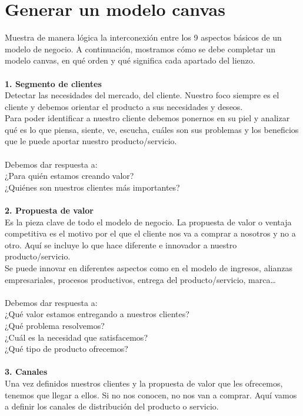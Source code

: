 \section{Generar un modelo canvas}
\item{
Muestra de manera lógica la interconexión entre los 9 aspectos básicos de un modelo de negocio. A continuación, mostramos cómo se debe completar un modelo canvas, en qué orden y qué significa cada apartado del lienzo.\\\\
\textbf{1. Segmento de clientes}\\
Detectar las necesidades del mercado, del cliente. Nuestro foco siempre es el cliente y debemos orientar el producto a sus necesidades y deseos.\\
Para poder identificar a nuestro cliente debemos ponernos en su piel y analizar qué es lo que piensa, siente, ve, escucha, cuáles son sus problemas y los beneficios que le puede aportar nuestro producto/servicio.\\\\
Debemos dar respuesta a:\\
¿Para quién estamos creando valor?\\
¿Quiénes son nuestros clientes más importantes?
\\\\\textbf{2. Propuesta de valor}\\
Es la pieza clave de todo el modelo de negocio. La propuesta de valor o ventaja competitiva es el motivo por el que el cliente nos va a comprar a nosotros y no a otro. Aquí se incluye lo que hace diferente e innovador a nuestro producto/servicio.\\
Se puede innovar en diferentes aspectos como en el modelo de ingresos, alianzas empresariales, procesos productivos, entrega del producto/servicio, marca…\\\\
Debemos dar respuesta a:\\
¿Qué valor estamos entregando a nuestros clientes?\\
¿Qué problema resolvemos?\\
¿Cuál es la necesidad que satisfacemos?\\
¿Qué tipo de producto ofrecemos?\\\\
\textbf{3. Canales}\\
Una vez definidos nuestros clientes y la propuesta de valor que les ofrecemos, tenemos que llegar a ellos. Si no nos conocen, no nos van a comprar. Aquí vamos a definir los canales de distribución del producto o servicio.\\\\
}
